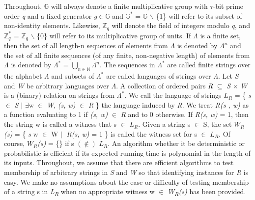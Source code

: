 \documentclass[a4paper]{article}
\begin{document}
  Throughout, $\mathbb{G}$ will always denote a finite multiplicative group with  \(\tau\)-bit prime order \emph{q} and a fixed generator \emph{g}\(\in\)$\mathbb{G}$ and $\mathbb{G}^{*}$ = $\mathbb{G}$ \ensuremath{\backslash} \{1\} will refer to its subset of non-identity elements. Likewise, $\mathbb{Z}_q$ will denote the field of integers modulo \emph{q}, and $\mathbb{Z}^{*}_q$ = $\mathbb{Z}_q$ \ensuremath{\backslash} \{0\} will refer to its multiplicative group of units.
  \newline
  \newline
  If \(\Lambda\) is a finite set, then the set of all length-n sequences of elements from \(\Lambda\) is denoted by \(\Lambda^n\) and the set of all finite sequences (of any finite, non-negative length) of elements from \(\Lambda\) is denoted by \(\Lambda^{*}\) = \( \bigcup_{n\in\mathbb{N}} \)\(\Lambda^n\). The sequences in \(\Lambda^{*}\) are called finite strings over the alphabet \(\Lambda\) and subsets of \(\Lambda^{*}\) are called languages of strings over \(\Lambda\). Let \textit{S} and \textit{W} be arbitrary languages over \(\Lambda\). A collection of ordered pairs \textit{R} \(\subseteq\) \textit{S} \(\times\) \textit{W} is a (binary) relation on strings from \(\Lambda^{*}\). We call the language of strings \textit{$L_R$} {=} \{ \textit{s} $\in$ \textit{S} \(\mid\) \(\exists\)w $\in$ \textit{W}, \textit{(s, w)} $\in$ \textit{R} \} the language induced by \textit{R}. We treat \textit{R(s , w)} as a function evaluating to 1 if \textit{(s, w)} $\in$ \textit{R} and to 0 otherwise. If \textit{R(s, w)} = 1, then the string w is called a witness that s $\in$ \textit{$L_R$}. Given a string s $\in$ S, the set \textit{$W_R$(s)} {=} \{ \textit{s} w $\in$ W \(\mid\) \textit{R(s, w)} {=} 1 \} is called the witness set for s $\in$ \textit{$L_R$}. Of course, \textit{$W_R$(s)} = \{\} if s $(\notin)$ \textit{$L_R$}.
  \newline
  An algorithm whether it be deterministic or probabilistic is efficient if its expected running time is polynomial in the length of its inputs.
  \newline
  Throughout, we assume that there are efficient algorithms to test membership of arbitrary strings in \textit{S} and \textit{W} so that identifying instances for \textit{R} is easy. 
  \newline
  We make no assumptions about the ease or difficulty of testing membership of a string s in \textit{L\textsubscript{R}} when no appropriate witness w $\in$ \textit{W\textsubscript{R}(s)} has been provided.
\end{document}
